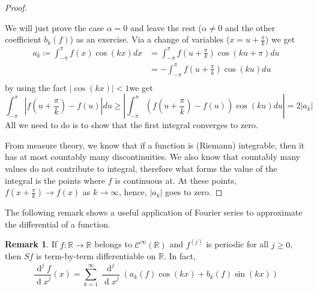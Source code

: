\documentclass[12pt]{amsart}
\theoremstyle{definition}
\newtheorem{remark}[theorem]{Remark}
\newcommand{\RR}{{\mathbb R}} %
\newcommand{\cC}{{\mathcal C}}
\newcommand{\de}{\operatorname{d}} %
\begin{document}
\begin{proof}\cite{Measure}\footnotemark{}



    We will just prove the case $\alpha = 0$ and leave the rest ($\alpha \neq 0$ and the other coefficient $b_k(f)$) as an exercise. Via a change of variables ($x = u + \frac{\pi}{k}$) we get
%
    \[
    \begin{aligned}
        a_k \coloneqq \int_{-\pi}^{\pi}f(x)\cos(kx) dx &= \int_{-\pi}^{\pi}f(u + \frac{\pi}{k})\cos(ku + \pi) du\\
        &= - \int_{-\pi}^{\pi}f(u + \frac{\pi}{k})\cos(ku) du\\
        \end{aligned}
    \]
        by using the fact $|\cos(kx)| < 1$we get
    \[
        \int_{-\pi}^{\pi}|f(u + \frac{\pi}{k}) - f(u)|du \geq \left|\int_{-\pi}^{\pi}(f(u + \frac{\pi}{k}) - f(u))\cos(ku)du\right| = 2|a_k|
    \]
All we need to do is to show that the first integral converges to zero.\footnotemark{}




From measure theory, we know that if a function is (Riemann) integrable, then it has at most countably many discontinuities. We also know that countably many values do not contribute to integral, therefore what forms the value of the integral is the points where $f$ is continuous at. At these points, $f(x + \frac{\pi}{k}) \to f(x)$ as $k \to \infty$, hence, $|a_k|$ goes to zero.



\end{proof}


The following remark shows a useful application of Fourier series to approximate the differential of a function.


\begin{remark}
    If $f: \RR \to \RR$ belongs to $\cC^\infty(\RR)$ and $f^{(j)}$ is periodic for all $j \geq 0$, then $Sf$ is term-by-term differentiable on $\RR$. In fact,
\[
\frac{\de ^jf}{{\de x}^j}(x) = \sum_{k = 1}^{\infty} \frac{\de ^j}{{\de x}^j}(a_k(f)\cos(kx) + b_k(f)\sin(kx))
\]
\end{remark}
\end{document}
